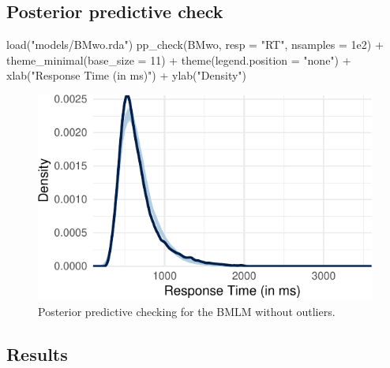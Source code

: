 \documentclass[
  11pt,
  english,
  ,doc,floatsintext]{apa6}
\newenvironment{Shaded}{}{}
\newcommand{\AttributeTok}[1]{\textcolor[rgb]{0.49,0.56,0.16}{#1}}
\newcommand{\DecValTok}[1]{\textcolor[rgb]{0.25,0.63,0.44}{#1}}
\newcommand{\FloatTok}[1]{\textcolor[rgb]{0.25,0.63,0.44}{#1}}
\newcommand{\FunctionTok}[1]{\textcolor[rgb]{0.02,0.16,0.49}{#1}}
\newcommand{\NormalTok}[1]{#1}
\newcommand{\SpecialCharTok}[1]{\textcolor[rgb]{0.25,0.44,0.63}{#1}}
\newcommand{\StringTok}[1]{\textcolor[rgb]{0.25,0.44,0.63}{#1}}
\begin{document}
\hypertarget{posterior-predictive-check}{%
\subsection{Posterior predictive check}\label{posterior-predictive-check}}

\begin{Shaded}
\begin{Highlighting}[]
\FunctionTok{load}\NormalTok{(}\StringTok{"models/BMwo.rda"}\NormalTok{)}
\FunctionTok{pp\_check}\NormalTok{(BMwo, }\AttributeTok{resp =} \StringTok{"RT"}\NormalTok{, }\AttributeTok{nsamples =} \FloatTok{1e2}\NormalTok{) }\SpecialCharTok{+}
  \FunctionTok{theme\_minimal}\NormalTok{(}\AttributeTok{base\_size =} \DecValTok{11}\NormalTok{) }\SpecialCharTok{+}
  \FunctionTok{theme}\NormalTok{(}\AttributeTok{legend.position =} \StringTok{"none"}\NormalTok{) }\SpecialCharTok{+}
  \FunctionTok{xlab}\NormalTok{(}\StringTok{"Response Time (in ms)"}\NormalTok{) }\SpecialCharTok{+}
  \FunctionTok{ylab}\NormalTok{(}\StringTok{"Density"}\NormalTok{)}
\end{Highlighting}
\end{Shaded}

\begin{figure}[htb]

{\centering \includegraphics[width=\textwidth]{supplementary_materials_files/figure-latex/ppcheckBMwo-1} 

}

\caption{Posterior predictive checking for the BMLM without outliers.}\label{fig:ppcheckBMwo}
\end{figure}

\newpage

\hypertarget{results}{%
\subsection{Results}\label{results}}
\end{document}

